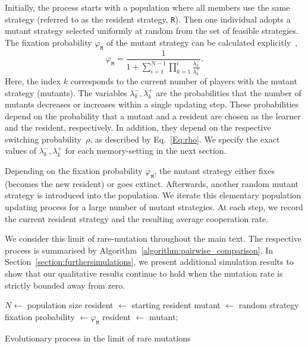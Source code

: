 \documentclass[11pt]{article}
\def\resident{\texttt{R}}
\def\mutant{\texttt{M}}
\theoremstyle{plainCl1}
\theoremstyle{plainCl2}
\begin{document}

Initially, the process starts with a population where all members use the same strategy (referred to as the resident strategy, \resident). 
Then one individual adopts a mutant strategy selected uniformly at random from the set of feasible strategies.
The fixation probability \(\varphi_{\mutant}\) of the mutant strategy can be calculated explicitly~\citep{nowak:Nature:2004},
\begin{equation}\label{eq:fixation_probability}
    \varphi_{\mutant} = \frac{1}{1+\sum\limits_{i=1}^{N-1}\prod\limits_{k=1}^i \frac{\lambda^-_k}{\lambda^+_k}}.
\end{equation}
Here, the index $k$ corresponds to the current number of players with the mutant strategy (mutants). 
The variables \(\lambda^-_k, \lambda^+_k\) are the probabilities that the number of mutants decreases or increases within a single updating step. 
These probabilities depend on the probability that a mutant and a resident are chosen as the learner and the resident, respectively. 
In addition, they depend on the respective switching probability~$\rho$, as described by Eq.~\eqref{Eq:rho}. 
We specify the exact values of  \(\lambda^-_k, \lambda^+_k\) for each memory-setting in the next section. 

Depending on the fixation probability \(\varphi_{\mutant}\), the mutant strategy either fixes (becomes the new resident) or goes extinct. 
Afterwards, another random mutant strategy is introduced into the population. 
We iterate this elementary population updating process for a large number of mutant strategies. 
At each step, we record the current resident strategy and the resulting average cooperation rate. 

We consider this limit of rare-mutation throughout the main text. 
The respective process is summarised by Algorithm~\ref{algorithm:pairwise_comparison}.
In Section~\ref{section:furthersimulations}, we present additional simulation results to show that our qualitative results continue to hold when the mutation rate is strictly bounded away from zero. 


\begin{algorithm}[t]
  \SetAlgoLined
  $N \leftarrow$ population size\;
  resident $\leftarrow$ starting resident\;
   {mutant $\leftarrow$ random strategy\;
   fixation probability $\leftarrow \varphi_\mutant $\;
   \If{$\varphi_{\mutant} >$ random: $i \rightarrow [0,1]$}
   {resident $\leftarrow$ mutant;}}
   \caption{Evolutionary process in the limit of rare mutations}\label{algorithm:pairwise_comparison}
\end{algorithm}
\end{document}
